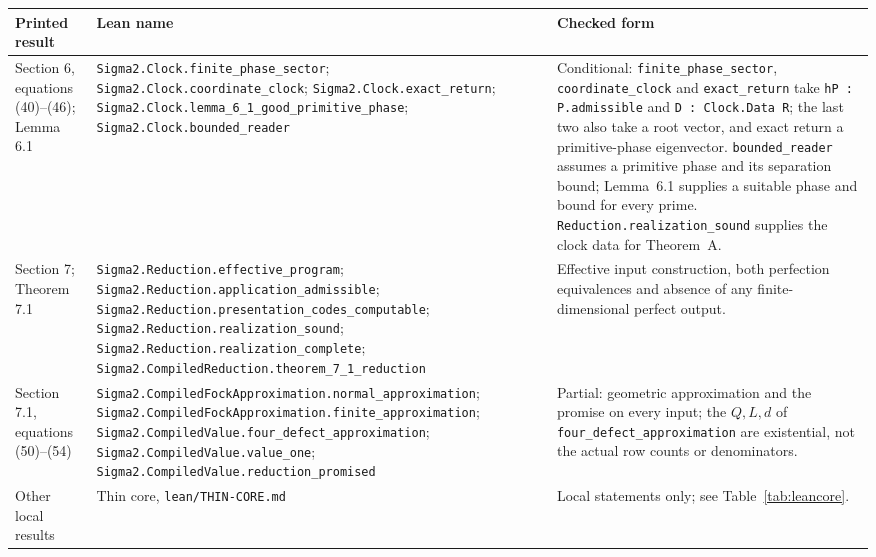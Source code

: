\begin{center}\footnotesize
\begin{minipage}{\linewidth}
\setlength{\tabcolsep}{4pt}
\begin{tabular}{@{}>{\raggedright\arraybackslash}p{.17\linewidth}>{\raggedright\arraybackslash}p{.44\linewidth}>{\raggedright\arraybackslash}p{.33\linewidth}@{}}
\toprule Printed result & Lean name & Checked form\\\midrule
Section 6, equations (40)--(46); Lemma 6.1 &
\nolinkurl{Sigma2.Clock.finite_phase_sector};
\nolinkurl{Sigma2.Clock.coordinate_clock};
\nolinkurl{Sigma2.Clock.exact_return};
\nolinkurl{Sigma2.Clock.lemma_6_1_good_primitive_phase};
\nolinkurl{Sigma2.Clock.bounded_reader} &
Conditional: \nolinkurl{finite_phase_sector}, \nolinkurl{coordinate_clock} and \nolinkurl{exact_return} take \nolinkurl{hP : P.admissible} and \nolinkurl{D : Clock.Data R}; the last two also take a root vector, and exact return a primitive-phase eigenvector. \nolinkurl{bounded_reader} assumes a primitive phase and its separation bound; Lemma~6.1 supplies a suitable phase and bound for every prime. \nolinkurl{Reduction.realization_sound} supplies the clock data for Theorem~A.\\[4pt]
Section 7; Theorem 7.1 &
\nolinkurl{Sigma2.Reduction.effective_program};
\nolinkurl{Sigma2.Reduction.application_admissible};
\nolinkurl{Sigma2.Reduction.presentation_codes_computable};
\nolinkurl{Sigma2.Reduction.realization_sound};
\nolinkurl{Sigma2.Reduction.realization_complete};
\nolinkurl{Sigma2.CompiledReduction.theorem_7_1_reduction} &
Effective input construction, both perfection equivalences and absence
of any finite-dimensional perfect output.\\[4pt]
Section 7.1, equations (50)--(54) &
\nolinkurl{Sigma2.CompiledFockApproximation.normal_approximation};
\nolinkurl{Sigma2.CompiledFockApproximation.finite_approximation};
\nolinkurl{Sigma2.CompiledValue.four_defect_approximation};
\nolinkurl{Sigma2.CompiledValue.value_one};
\nolinkurl{Sigma2.CompiledValue.reduction_promised} &
Partial: geometric approximation and the promise on every input; the
$Q,L,d$ of \nolinkurl{four_defect_approximation} are existential, not the
actual row counts or denominators.\\[4pt]
Other local results &
Thin core, \nolinkurl{lean/THIN-CORE.md} &
Local statements only; see Table~\ref{tab:leancore}.\\
\bottomrule
\end{tabular}
\end{minipage}
\end{center}

